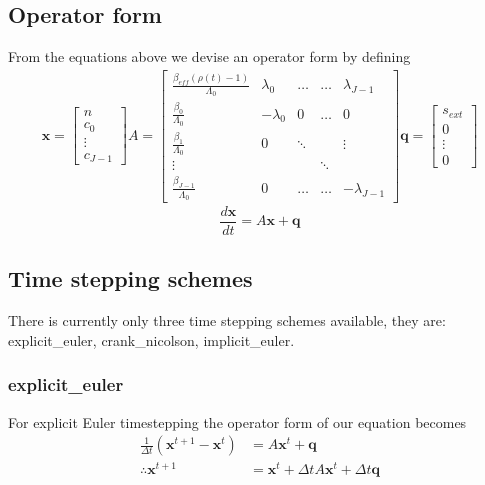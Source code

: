 \documentclass[11pt,letterpaper,notitlepage]{article}
\newcommand{\beqn}{\begin{equation}
		\begin{aligned}}
\newcommand{\eeqn}{\end{aligned}
\end{equation}}
\numberwithin{equation}{section}
\begin{document}
\subsection{Operator form}
From the equations above we devise an operator form by defining
\begin{equation*}
\begin{aligned}
	\mathbf{x} = 
	\begin{bmatrix}
		n \\
		c_0 \\
		\vdots \\
		c_{J-1}
	\end{bmatrix}
	A = 
	\begin{bmatrix}
		\frac{\beta_{eff} ( \rho (t) - 1)}{\Lambda_0} & \lambda_0 & \dots & \dots & \lambda_{J-1} \\
		\frac{\beta_{0}}{\Lambda_0} & -\lambda_0 & 0 & \dots & 0\\ 
		\frac{\beta_{1}}{\Lambda_0} & 0 & \ddots &   & \vdots\\
		\vdots & & & \ddots \\
		\frac{\beta_{J-1}}{\Lambda_0} & 0 &\dots & \dots & -\lambda_{J-1}
	\end{bmatrix}
	\mathbf{q} = 
	\begin{bmatrix}
		s_{ext} \\
		0 \\
		\vdots \\
		0
	\end{bmatrix}
\end{aligned}
\end{equation*}
\begin{equation}
	\frac{d\mathbf{x}}{dt} = A \mathbf{x} + \mathbf{q}
\end{equation}

\subsection{Time stepping schemes}
There is currently only three time stepping schemes available, they are: \newline
{\ttfamily explicit\_euler, crank\_nicolson, implicit\_euler}.
\subsubsection{{\ttfamily explicit\_euler}}
For explicit Euler timestepping the operator form of our equation becomes
\beqn 
\frac{1}{\Delta t} (\mathbf{x}^{t+1} - \mathbf{x}^t) &= A \mathbf{x}^t + \mathbf{q} \\
\therefore \mathbf{x}^{t+1} &= \mathbf{x}^t + \Delta t A \mathbf{x}^t + \Delta t \mathbf{q}
\eeqn 
\end{document}
